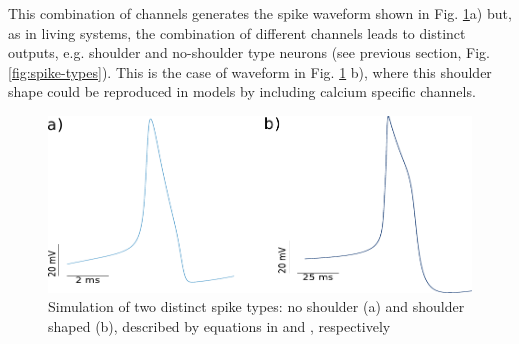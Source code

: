 \begin{table}[h!]
	\label{table:hh-equations}
\end{table}

This combination of channels generates the spike waveform shown in Fig. \ref{fig:spike-types model}a) but, as in living systems, the combination of different channels leads to distinct outputs, e.g. shoulder and no-shoulder type neurons (see previous section, Fig. \ref{fig:spike-types}). This is the case of waveform in Fig. \ref{fig:spike-types model} b), where this shoulder shape could be reproduced in models by including calcium specific channels.

\begin{figure}[htb!]
	\includegraphics[width=\textwidth]{img/intro/spike-types model.pdf}
	\caption{Simulation of two distinct spike types: no shoulder (a) and shoulder shaped (b), described by equations in \cite{hodgkin_quantitative_1952} and \cite{vavoulis_balanced_2010}, respectively}
	\label{fig:spike-types model}
\end{figure}

